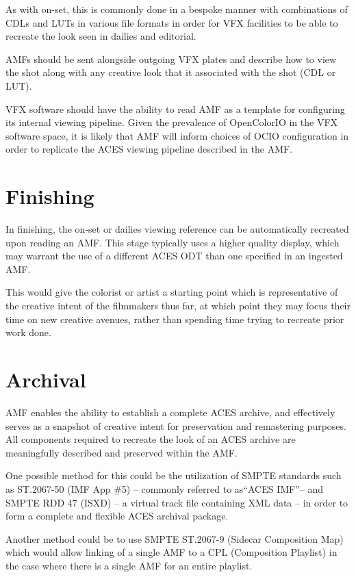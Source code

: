 As with on-set, this is commonly done in a bespoke manner with combinations of CDLs and LUTs in various file formats in order for VFX facilities to be able to recreate the look seen in dailies and editorial.  

AMFs should be sent alongside outgoing VFX plates and describe how to view the shot along with any creative look that it associated with the shot (CDL or LUT).

VFX software should have the ability to read AMF as a template for configuring its internal viewing pipeline. Given the prevalence of OpenColorIO in the VFX software space, it is likely that AMF will inform choices of OCIO configuration in order to replicate the ACES viewing pipeline described in the AMF.

\section{Finishing}
In finishing, the on-set or dailies viewing reference can be automatically recreated upon reading an AMF. This stage typically uses a higher quality display, which may warrant the use of a different ACES ODT than one specified in an ingested AMF.

This would give the colorist or artist a starting point which is representative of the creative intent of the filmmakers thus far, at which point they may focus their time on new creative avenues, rather than spending time trying to recreate prior work done.

\section{Archival}
AMF enables the ability to establish a complete ACES archive, and effectively serves as a snapshot of creative intent for preservation and remastering purposes. All components required to recreate the look of an ACES archive are meaningfully described and preserved within the AMF.

One possible method for this could be the utilization of SMPTE standards such as ST.2067-50 (IMF App \#5) -- commonly referred to as``ACES IMF''-- and SMPTE RDD 47 (ISXD) -- a virtual track file containing XML data -- in order to form a complete and flexible ACES archival package.

Another method could be to use SMPTE ST.2067-9 (Sidecar Composition Map) which would allow linking of a single AMF to a CPL (Composition Playlist) in the case where there is a single AMF for an entire playlist.
